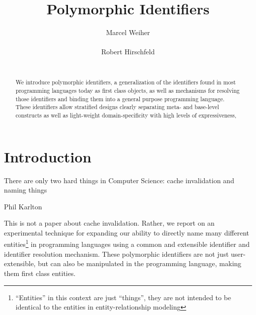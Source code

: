\documentclass[preprint,authoryear]{acm_proc_article-sp}
\begin{document}


\title{Polymorphic Identifiers}

\author{
\alignauthor Marcel Weiher\\
       \\
\alignauthor Robert Hirschfeld\\
       \\
}

\maketitle

\begin{abstract}
We introduce polymorphic identifiers, a generalization of the  identifiers found in most
programming languages today as first class objects, as well as mechanisms for
resolving those identifiers and binding them into a general purpose programming language.
These identifiers allow stratified designs clearly separating meta- and base-level constructs
as well as light-weight domain-specificity with high levels of expressiveness, 
\end{abstract}


\setlength{\epigraphrule}{0pt}


\section{Introduction}
\epigraph{There are only two hard things in Computer Science:  cache invalidation and naming things} {Phil Karlton}

This is not a paper about cache invalidation.   Rather, we report on an experimental
technique for expanding our ability to directly name many different 
entities\footnote{``Entities'' in this context are just ``things'', they are not intended to be identical
to the entities in entity-relationship modeling} in 
programming languages using a common and extensible identifier and identifier resolution
mechanism.
These polymorphic identifiers are not just user-extensible,
but can also be manipulated in the programming language, making them first class 
entities.
\end{document}
